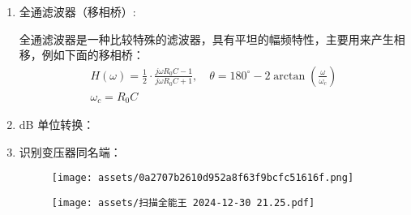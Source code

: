 \documentclass[a4paper]{article}  %
\theoremstyle{MyLineTheoremStyle} %
\theoremstyle{MyBlockTheoremStyle} %
\theoremstyle{MySubsubsectionStyle} %
\begin{document}
\begin{multicols*}{4}
\begin{enumerate}
\item 全通滤波器（移相桥）:

全通滤波器是一种比较特殊的滤波器，具有平坦的幅频特性，主要用来产生相移，例如下面的移相桥：
\begin{gather}
H(\omega) = \frac{1}{2}\cdot\frac{j\omega R_0C - 1}{j\omega R_0C + 1},\quad \theta = 180^{\circ} - 2 \arctan \left(\frac{\omega}{\omega_c} \right)\\
\omega_c = R_0C
\end{gather}


\item dB 单位转换：
\begin{table}[H]\centering
    \caption{增益与 dB 值的对应关系}
    \label{增益与 dB 值的对应关系}
\end{table}

\item 识别变压器同名端：
\begin{figure}[H]\centering
    \texttt{[image: assets/0a2707b2610d952a8f63f9bcfc51616f.png]}
\end{figure}

\begin{figure}[H]\centering
    \texttt{[image: assets/扫描全能王 2024-12-30 21.25.pdf]}
\end{figure}

\end{enumerate}
\end{multicols*}  
\end{document}
